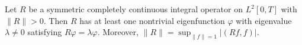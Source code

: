 Let $R$ be a symmetric completely continuous integral operator on $L^2[0,T]$ with $\|R\| > 0$. Then $R$ has at least one nontrivial eigenfunction $\varphi$ with eigenvalue $\lambda \neq 0$ satisfying $R\varphi = \lambda\varphi$. Moreover, $\|R\| = \sup_{\|f\|=1} |(Rf,f)|$.

